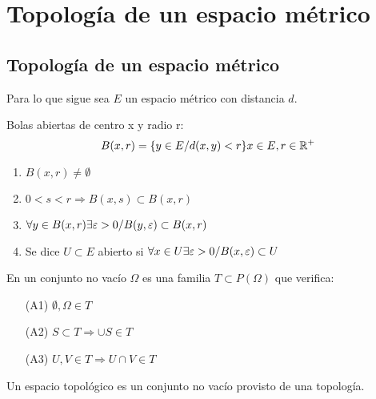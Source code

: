 \chapter{Topología de un espacio métrico}
\section{Topología de un espacio métrico}
    Para lo que sigue sea $E$ un espacio métrico con distancia $d$.\\
    \begin{definicion}
        Bolas abiertas de centro x y radio r:
        $$B(x,r) = \{ y \in E / d(x,y)< r\} \\ x \in E, \\ r \in \mathbb R^+ $$
        \begin{enumerate}
            \item $B(x,r) \neq \emptyset$
            \item $0 < s < r \Longrightarrow B(x,s) \subset B(x,r)$
            \item $\forall y \in B(x,r) \\ \exists \varepsilon >0 \\ / \\ B(y,\varepsilon) \subset B(x,r)$
            \item Se dice $U\subset E$ abierto si $\forall x \in U \\\exists \varepsilon > 0 \\/ \\B(x, \varepsilon ) \subset U$
        \end{enumerate}
    \end{definicion}
    
    \begin{definicion}[Topología]
        En un conjunto no vacío $\Omega$ es una familia $T \subset P(\Omega)$ que verifica:
        \begin{itemize}
            \item[(A1)] $\emptyset, \Omega \in T$
            \item[(A2)] $S \subset T \Longrightarrow \cup S \in T$
            \item[(A3)] $U, V \in T \Longrightarrow U \cap V \in T$
        \end{itemize}
    Un espacio topológico es un conjunto no vacío provisto de una topología. 
    \end{definicion}

